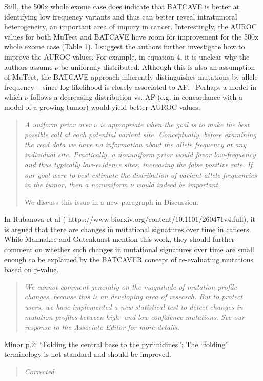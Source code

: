 \documentclass[11pt]{article}
\newenvironment{response}
{\begin{quote}\itshape}
{\end{quote}}
\begin{document}
Still, the 500x whole exome case does indicate that BATCAVE is better at identifying low frequency variants and thus can better reveal intratumoral heterogeneity, an important area of inquiry in cancer. Interestingly, the AUROC values for both MuTect and BATCAVE have room for improvement for the 500x whole exome case (Table 1). I suggest the authors further investigate how to improve the AUROC values. For example, in equation 4, it is unclear why the authors assume $\nu$ be uniformly distributed. Although this is also an assumption of MuTect, the BATCAVE approach inherently distinguishes mutations by allele frequency – since log-likelihood is closely associated to AF.  Perhaps a model in which $\nu$ follows a decreasing distribution vs. AF (e.g. in concordance with a model of a growing tumor) would yield better AUROC values.  
\begin{response}
A uniform prior over $\nu$ is appropriate when the goal is to make the best possible call at each potential variant site.
Conceptually, before examining the read data we have no information about the allele frequency at any individual site.
Practically, a nonuniform prior would favor low-frequency and thus typically low-evidence sites, increasing the false positive rate.
If our goal were to best estimate the distribution of variant allele frequencies in the tumor, then a nonuniform $\nu$ would indeed be important.

We discuss this issue in a new paragraph in Discussion.
\end{response}

In Rubanova et al ( https://www.biorxiv.org/content/10.1101/260471v4.full), it is argued that there are changes in mutational signatures over time in cancers. While Mannakee and Gutenkunst mention this work, they should further comment on whether such changes in mutational signatures over time are small enough to be explained by the BATCAVER concept of re-evaluating mutations based on p-value.
\begin{response}
We cannot comment generally on the magnitude of mutation profile changes, because this is an developing area of research.
But to protect users, we have implemented a new statistical test to detect changes in mutation profiles between high- and low-confidence mutations.
See our response to the Associate Editor for more details.
\end{response}

Minor
p.2: “Folding the central base to the pyrimidines”: The “folding” terminology is not standard and should be improved. 
\begin{response}
Corrected
\end{response}
\end{document}
